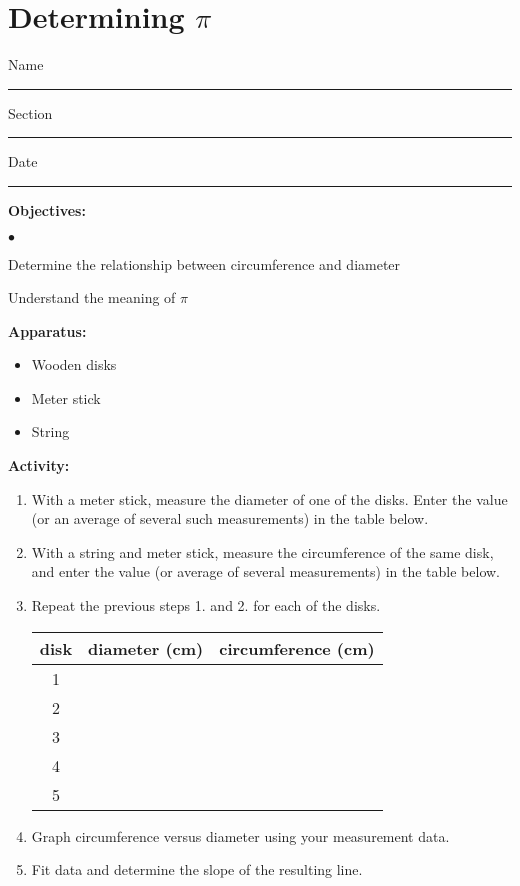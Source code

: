 
\section{Determining $\pi$}

Name \rule{2.0in}{0.1pt}\hfill{}Section \rule{1.0in}{0.1pt}\hfill{}Date \rule{1.0in}{0.1pt}

{\noindent \bf Objectives:}

\begin{list}{$\bullet$}{\itemsep0pt }

\item Determine the relationship between circumference and diameter \item Understand the meaning of $\pi$

\end{list}

\textbf{Apparatus:}

\begin{itemize}
\item Wooden disks
\item Meter stick
\item String
\end{itemize}
{\noindent \bf Activity:}

\begin{enumerate}

\item With a meter stick, measure the diameter of one of the disks. Enter the value (or an average of several such measurements) in the table below.

\item With a string and meter stick, measure the circumference of the same disk, and enter the value (or average of several measurements) in the table below.

\item Repeat the previous steps 1. and 2. for each of the disks.

\begin{center} \begin{tabular}{|c|c|c|} \hline disk & diameter (cm) & circumference (cm) \\ \hline\hline 1 & & \\ \hline 2 & & \\ \hline 3 & & \\ \hline 4 & & \\ \hline 5 & & \\ \hline \end{tabular} \end{center}

\item Graph circumference versus diameter using your measurement data.

\item Fit data and determine the slope of the resulting line. \end{enumerate}

